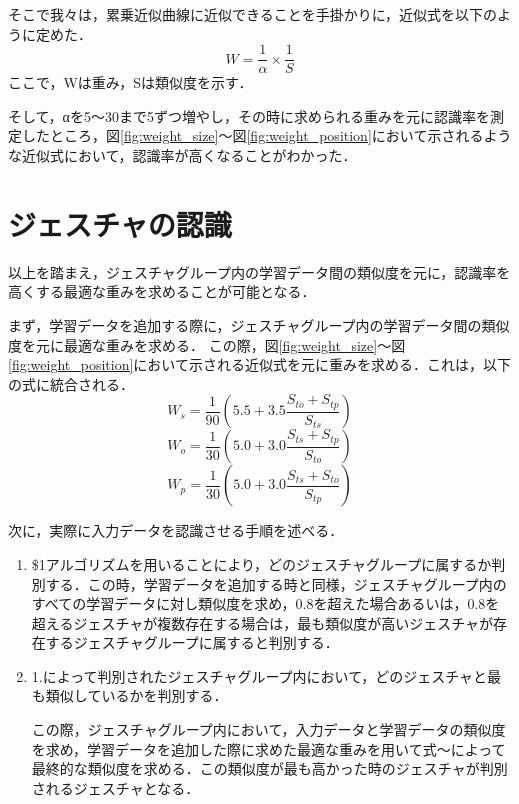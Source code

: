 そこで我々は，累乗近似曲線に近似できることを手掛かりに，近似式を以下のように定めた．\begin{equation}
W = \frac{1}{α} \times \frac{1}{S} 
\end{equation}
ここで，Wは重み，Sは類似度を示す．

そして，αを5〜30まで5ずつ増やし，その時に求められる重みを元に認識率を測定したところ，図\ref{fig:weight_size}〜図\ref{fig:weight_position}において示されるような近似式において，認識率が高くなることがわかった．


\section{ジェスチャの認識}
以上を踏まえ，ジェスチャグループ内の学習データ間の類似度を元に，認識率を高くする最適な重みを求めることが可能となる．

まず，学習データを追加する際に，ジェスチャグループ内の学習データ間の類似度を元に最適な重みを求める．
この際，図\ref{fig:weight_size}〜図\ref{fig:weight_position}において示される近似式を元に重みを求める．これは，以下の式に統合される．
\begin{equation}
W_\textit{s} = \frac{1}{90}(5.5 + 3.5\frac{S_\textit{to} + S_\textit{tp}}{S_\textit{ts}})
\end{equation}
\begin{equation}
W_\textit{o} = \frac{1}{30}(5.0 + 3.0\frac{S_\textit{ts} + S_\textit{tp}}{S_\textit{to}})
\end{equation}
\begin{equation}
W_\textit{p} = \frac{1}{30}(5.0 + 3.0\frac{S_\textit{ts} + S_\textit{to}}{S_\textit{tp}})
\end{equation}


次に，実際に入力データを認識させる手順を述べる．
\begin{enumerate}
\item \$1アルゴリズムを用いることにより，どのジェスチャグループに属するか判別する．この時，学習データを追加する時と同様，ジェスチャグループ内のすべての学習データに対し類似度を求め，0.8を超えた場合あるいは，0.8を超えるジェスチャが複数存在する場合は，最も類似度が高いジェスチャが存在するジェスチャグループに属すると判別する．
\item 1.によって判別されたジェスチャグループ内において，どのジェスチャと最も類似しているかを判別する．

この際，ジェスチャグループ内において，入力データと学習データの類似度を求め，学習データを追加した際に求めた最適な重みを用いて式〜によって最終的な類似度を求める．この類似度が最も高かった時のジェスチャが判別されるジェスチャとなる．

\end{enumerate}






